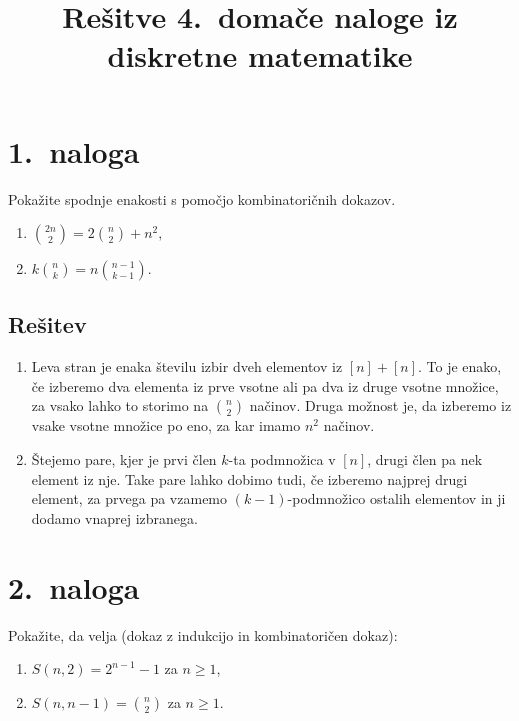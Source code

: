 \documentclass[11pt]{article}
\title{Rešitve 4.\ domače naloge iz diskretne matematike}
\author{}
\date{}
\begin{document}
\maketitle

\section*{1.~naloga}
Pokažite spodnje enakosti s pomočjo kombinatoričnih dokazov.
\begin{enumerate}[label=(\alph*)]
    \item
    \(
        \binom{2n}{2} = 2\binom{n}{2} + n^2,
    \)
    \item
    \(
        k\binom{n}{k} = n\binom{n-1}{k-1}.
    \)
\end{enumerate}

\subsection*{Rešitev}
\begin{enumerate}[label=(\alph*)]
    \item Leva stran je enaka številu izbir dveh elementov iz \([n] + [n]\). To je enako, če izberemo dva elementa
        iz prve vsotne ali pa dva iz druge vsotne množice, za vsako lahko to storimo na \(\binom{n}{2}\) načinov.
        Druga možnost je, da izberemo iz vsake vsotne množice po eno, za kar imamo \(n^2\) načinov.
    \item Štejemo pare, kjer je prvi člen \(k\)-ta podmnožica v \([n]\), drugi člen pa nek element iz nje. 
        Take pare lahko dobimo tudi, če izberemo najprej drugi element, za prvega pa vzamemo \(\left(k-1\right)\)-podmnožico
        ostalih elementov in ji dodamo vnaprej izbranega.
\end{enumerate}

\section*{2.~naloga}
Pokažite, da velja (dokaz z indukcijo in kombinatoričen dokaz):
\begin{enumerate}[label=(\alph*)]
    \item \(S(n, 2) = 2^{n - 1} - 1\) \quad za \quad \(n \ge 1\),
    \item \(S(n, n-1) = \binom{n}{2}\) \quad za \quad \(n \ge 1\).
\end{enumerate}
\end{document}
